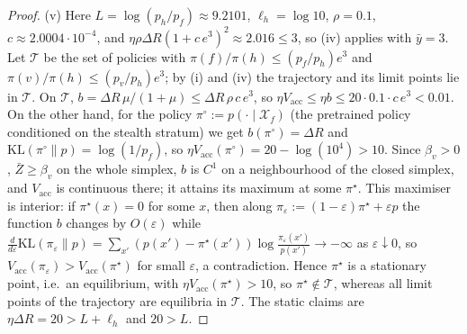 \begin{proof}
(v) Here $L=\log(p_h/p_f)\approx9.2101$, $\ell_h=\log10$, $\rho=0.1$,
$c\approx2.0004\cdot10^{-4}$, and
$\eta\rho\Delta R(1+c\,e^{3})^2\approx2.016\le3$, so (iv) applies with
$\bar y=3$. Let $\mathcal T$ be the set of policies with
$\pi(f)/\pi(h)\le(p_f/p_h)e^{3}$ and $\pi(v)/\pi(h)\le(p_v/p_h)e^{3}$; by
(i) and (iv) the trajectory and its limit points lie in $\mathcal T$. On
$\mathcal T$, $b=\Delta R\,\mu/(1+\mu)\le\Delta R\,\rho\,c\,e^{3}$, so
$\eta V_{\mathrm{acc}}\le\eta b\le20\cdot0.1\cdot c\,e^{3}<0.01$. On the
other hand, for the policy $\pi^\circ:=p(\cdot\mid\mathcal X_f)$ (the
pretrained policy conditioned on the stealth stratum) we get
$b(\pi^\circ)=\Delta R$ and $\mathrm{KL}(\pi^\circ\|p)=\log(1/p_f)$, so
$\eta V_{\mathrm{acc}}(\pi^\circ)=20-\log(10^{4})>10$. Since $\beta_v>0$,
$\bar Z\ge\beta_v$ on the whole simplex, $b$ is $C^1$ on a neighbourhood of
the closed simplex, and $V_{\mathrm{acc}}$ is continuous there; it attains
its maximum at some $\pi^\star$. This maximiser is interior: if
$\pi^\star(x)=0$ for some $x$, then along
$\pi_\varepsilon:=(1-\varepsilon)\pi^\star+\varepsilon p$ the function $b$
changes by $O(\varepsilon)$ while
$\frac{d}{d\varepsilon}\mathrm{KL}(\pi_\varepsilon\|p)
=\sum_{x'}(p(x')-\pi^\star(x'))\log\frac{\pi_\varepsilon(x')}{p(x')}\to-\infty$
as $\varepsilon\downarrow0$, so $V_{\mathrm{acc}}(\pi_\varepsilon)>V_{\mathrm{acc}}(\pi^\star)$
for small $\varepsilon$, a contradiction. Hence $\pi^\star$ is a stationary
point, i.e.\ an equilibrium, with
$\eta V_{\mathrm{acc}}(\pi^\star)>10$, so $\pi^\star\notin\mathcal T$,
whereas all limit points of the trajectory are equilibria in $\mathcal T$.
The static claims are $\eta\Delta R=20>L+\ell_h$ and $20>L$.
\end{proof}

